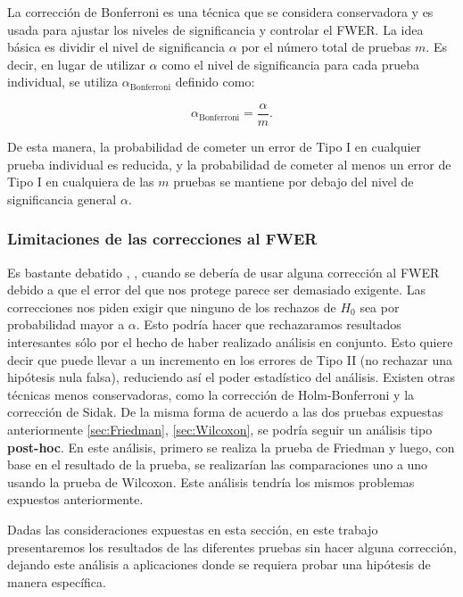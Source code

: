 La corrección de Bonferroni es una técnica que se considera conservadora y es usada  para ajustar los niveles de significancia y controlar el FWER. La idea básica es dividir el nivel de significancia $\alpha$ por el número total de pruebas $m$. Es decir, en lugar de utilizar $\alpha$ como el nivel de significancia para cada prueba individual, se utiliza $\alpha_{\text{Bonferroni}}$ definido como:

\begin{equation} \label{eq:Bonferroni}
\alpha_{\text{Bonferroni}} = \frac{\alpha}{m}.
\end{equation}

De esta manera, la probabilidad de cometer un error de Tipo I en cualquier prueba individual es reducida, y la probabilidad de cometer al menos un error de Tipo I en cualquiera de las $m$ pruebas se mantiene por debajo del nivel de significancia general $\alpha$.


\subsubsection{Limitaciones de las correcciones al FWER}

Es bastante debatido \cite{pernegerWhatWrongBonferroni1998}, \cite{nakagawaFarewellBonferroniProblems2004}, \cite{goemanMultipleHypothesisTesting2014}  cuando se debería de usar alguna corrección al FWER debido a que el error del que nos protege parece ser demasiado exigente. Las correcciones nos piden exigir que ninguno de los rechazos de $H_0$ sea por probabilidad mayor a $\alpha$. Esto podría hacer que rechazaramos resultados interesantes sólo por el hecho de haber realizado análisis en conjunto. Esto quiere decir que puede llevar a un incremento en los errores de Tipo II (no rechazar una hipótesis nula falsa), reduciendo así el poder estadístico del análisis. Existen otras técnicas menos conservadoras, como la corrección de Holm-Bonferroni y la corrección de Sidak. De la misma forma de acuerdo a las dos pruebas expuestas anteriormente \ref{sec:Friedman}, \ref{sec:Wilcoxon}, se podría seguir un análisis tipo \textbf{post-hoc}. En este análisis, primero se realiza la prueba de Friedman y luego, con base en el resultado de la prueba, se realizarían las comparaciones uno a uno usando la prueba de Wilcoxon. Este análisis tendría los mismos problemas expuestos anteriormente.

Dadas las consideraciones expuestas en esta sección, en este trabajo presentaremos los resultados de las diferentes pruebas sin hacer alguna corrección, dejando este análisis a aplicaciones donde se requiera probar una hipótesis de manera específica.  



